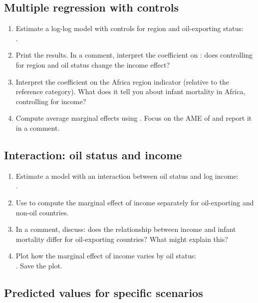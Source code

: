 \subsection{Multiple regression with controls}

\begin{enumerate}[label=\alph*)]
  \item Estimate a log-log model with controls for region and oil-exporting status: \\.
  \item Print the results. In a comment, interpret the coefficient on : does controlling for region and oil status change the income effect?
  \item Interpret the coefficient on the Africa region indicator (relative to the reference category). What does it tell you about infant mortality in Africa, controlling for income?
  \item Compute average marginal effects using . Focus on the AME of  and report it in a comment.
\end{enumerate}

\subsection{Interaction: oil status and income}

\begin{enumerate}[label=\alph*)]
  \item Estimate a model with an interaction between oil status and log income: \\.
  \item Use  to compute the marginal effect of income separately for oil-exporting and non-oil countries.
  \item In a comment, discuss: does the relationship between income and infant mortality differ for oil-exporting countries? What might explain this?
  \item Plot how the marginal effect of income varies by oil status: \\. Save the plot.
\end{enumerate}

\subsection{Predicted values for specific scenarios}

